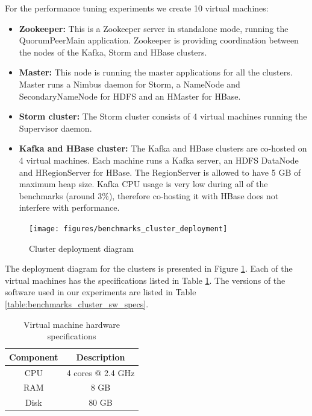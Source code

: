 For the performance tuning experiments we create 10 virtual machines:
\begin{itemize}
\item \textbf{Zookeeper:} This is a Zookeeper server in standalone mode, running the QuorumPeerMain application. Zookeeper is providing coordination between the nodes of the Kafka, Storm and HBase clusters.
\item \textbf{Master:} This node is running the master applications for all the clusters. Master runs a Nimbus daemon for Storm, a NameNode and SecondaryNameNode for HDFS and an HMaster for HBase.
\item \textbf{Storm cluster:} The Storm cluster consists of 4 virtual machines running the Supervisor daemon.
\item \textbf{Kafka and HBase cluster:} The Kafka and HBase clusters are co-hosted on 4 virtual machines. Each machine runs a Kafka server, an HDFS DataNode and HRegionServer for HBase. The RegionServer is allowed to have 5 GB of maximum heap size. Kafka CPU usage is very low during all of the benchmarks (around 3\%), therefore co-hosting it with HBase does not interfere with performance.
\end{itemize}

\begin{figure}[H]
\centering
\texttt{[image: figures/benchmarks\_cluster\_deployment]}
\caption{Cluster deployment diagram}
\label{figure:benchmarks_cluster_deployment}
\end{figure}

The deployment diagram for the clusters is presented in Figure \ref{figure:benchmarks_cluster_deployment}. Each of the virtual machines has the specifications listed in Table \ref{table:benchmarks_cluster_hw_specs}. The versions of the software used in our experiments are listed in Table \ref{table:benchmarks_cluster_sw_specs}.

\begin{table}[H]
\centering
\begin{tabular}{ |c|c| }
\hline
Component & Description \\ \hline \hline
CPU & 4 cores @ 2.4 GHz \\ \hline
RAM & 8 GB \\ \hline
Disk & 80 GB \\ \hline
\end{tabular}
\caption{Virtual machine hardware specifications}
\label{table:benchmarks_cluster_hw_specs}
\end{table}

